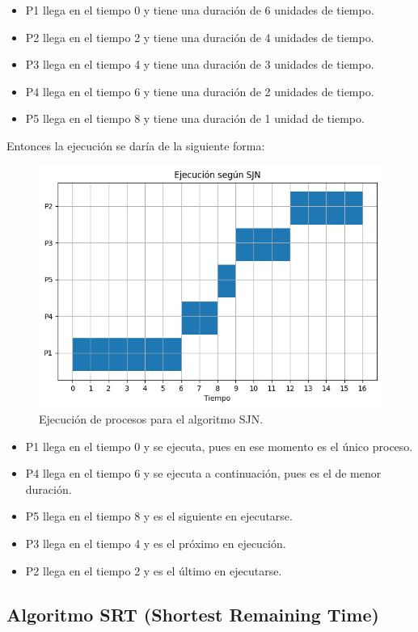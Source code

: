 \begin{itemize} 
	\item P1 llega en el tiempo 0 y tiene una duración de 6 unidades de tiempo. 
	\item P2 llega en el tiempo 2 y tiene una duración de 4 unidades de tiempo. 
	\item P3 llega en el tiempo 4 y tiene una duración de 3 unidades de tiempo. 
	\item P4 llega en el tiempo 6 y tiene una duración de 2 unidades de tiempo. 
	\item P5 llega en el tiempo 8 y tiene una duración de 1 unidad de tiempo. 
\end{itemize}
Entonces la ejecución se daría de la siguiente forma:
\begin{figure}[H] \centering \includegraphics[width=0.8\linewidth]{Imagenes/sjn_ejecucion.png} 
	\caption{Ejecución de procesos para el algoritmo SJN.} 
\end{figure}
\begin{itemize} 
    \item P1 llega en el tiempo 0 y se ejecuta, pues en ese momento es el único proceso. 
    \item P4 llega en el tiempo 6 y se ejecuta a continuación, pues es el de menor duración. 
    \item P5 llega en el tiempo 8 y es el siguiente en ejecutarse. 
    \item P3 llega en el tiempo 4 y es el próximo en ejecución. 
    \item P2 llega en el tiempo 2 y es el último en ejecutarse. 
\end{itemize}




\subsection{Algoritmo SRT (Shortest Remaining Time)}

